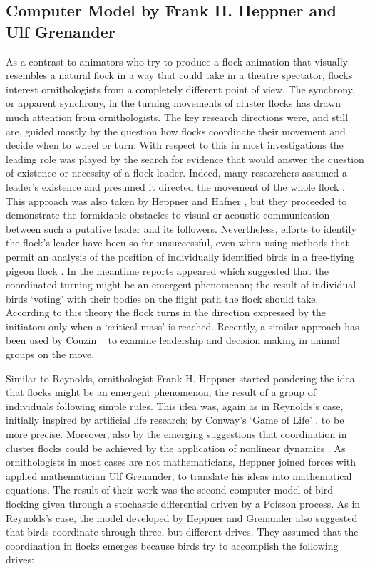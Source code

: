\subsection{Computer Model by Frank H. Heppner and Ulf Grenander}
\label{sec:birdFlocks:fhh}
As a contrast to animators who try to produce a flock animation that visually resembles a natural flock in a way that could take in a theatre spectator, flocks interest ornithologists from a completely different point of view. The synchrony, or apparent synchrony, in the turning movements of cluster flocks has drawn much attention from ornithologists. The key research directions were, and still are, guided mostly by the question how flocks coordinate their movement and decide when to wheel or turn. With respect to this in most investigations the leading role was played by the search for evidence that would answer the question of existence or necessity of a flock leader. Indeed, many researchers assumed a leader's existence and presumed it directed the movement of the whole flock \cite{heppner:1990}. This approach was also taken by Heppner and Hafner \cite{heppner:1974b}, but they proceeded to demonstrate the formidable obstacles to visual or acoustic communication between such a putative leader and its followers. Nevertheless, efforts to identify the flock's leader have been so far unsuccessful, even when using methods that permit an analysis of the position of individually identified birds in a free-flying pigeon flock \cite{pomeroy:1992}. In the meantime reports appeared \cite{davis:1980} which suggested that the coordinated turning might be an emergent phenomenon; the result of individual birds `voting' with their bodies on the flight path the flock should take. According to this theory the flock turns in the direction expressed by the initiators only when a `critical mass' is reached. Recently, a similar approach has been used by Couzin \etal\ \cite{couzin:2005} to examine leadership and decision making in animal groups on the move.

Similar to Reynolds, ornithologist Frank H. Heppner started pondering the idea that flocks might be an emergent phenomenon; the result of a group of individuals following simple rules. This idea was, again as in Reynolds's case, initially inspired by artificial life research; by Conway's `Game of Life' \cite{gardner:1970}, to be more precise. Moreover, also by the emerging suggestions that coordination in cluster flocks could be achieved by the application of nonlinear dynamics \cite{okubo:1986}. As ornithologists in most cases are not mathematicians, Heppner joined forces with applied mathematician Ulf Grenander, to translate his ideas into mathematical equations. The result of their work was the second computer model of bird flocking \cite{heppner:1990} given through a stochastic differential driven by a Poisson process. As in Reynolds's case, the model developed by Heppner and Grenander also suggested that birds coordinate through three, but different drives. They assumed that the coordination in flocks emerges because birds try to accomplish the following drives:

